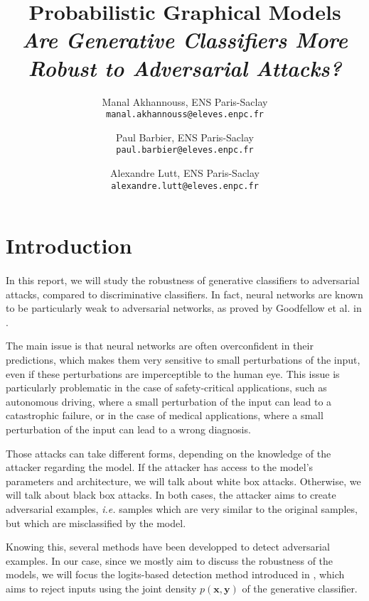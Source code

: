 \documentclass[11pt,twocolumn,letterpaper]{article}
\begin{document}
\title{\LARGE Probabilistic Graphical Models \\ \textit{Are Generative Classiﬁers More Robust to Adversarial Attacks?}}

\author{Manal Akhannouss, ENS Paris-Saclay\\
{\tt\small manal.akhannouss@eleves.enpc.fr}
\and
Paul Barbier, ENS Paris-Saclay\\
{\tt\small paul.barbier@eleves.enpc.fr}
\and
Alexandre Lutt, ENS Paris-Saclay\\
{\tt\small alexandre.lutt@eleves.enpc.fr}
}
\maketitle


\section{Introduction}
\label{sec:intro}

\paragraph{} In this report, we will study the robustness of generative classifiers to adversarial attacks, compared to discriminative classifiers. In fact, neural networks are known to be particularly weak to adversarial networks, as proved by Goodfellow et al. in \cite{fast_gradient_sign}. 
 
The main issue is that neural networks are often overconfident in their predictions, which makes them very sensitive to small perturbations of the input, even if these perturbations are imperceptible to the human eye. This issue is particularly problematic in the case of safety-critical applications, such as autonomous driving, where a small perturbation of the input can lead to a catastrophic failure, or in the case of medical applications, where a small perturbation of the input can lead to a wrong diagnosis. 

Those attacks can take different forms, depending on the knowledge of the attacker regarding the model. If the attacker has access to the model's parameters and architecture, we will talk about white box attacks. Otherwise, we will talk about black box attacks. In both cases, the attacker aims to create adversarial examples, \textit{i.e.} samples which are very similar to the original samples, but which are misclassified by the model. 

Knowing this, several methods have been developped to detect adversarial examples. In our case, since we mostly aim to discuss the robustness of the models, we will focus the logits-based detection method introduced in \cite{main_paper}, which aims to reject inputs using the joint density $p(\bm{x}, \bm{y})$ of the generative classifier.
\end{document}

